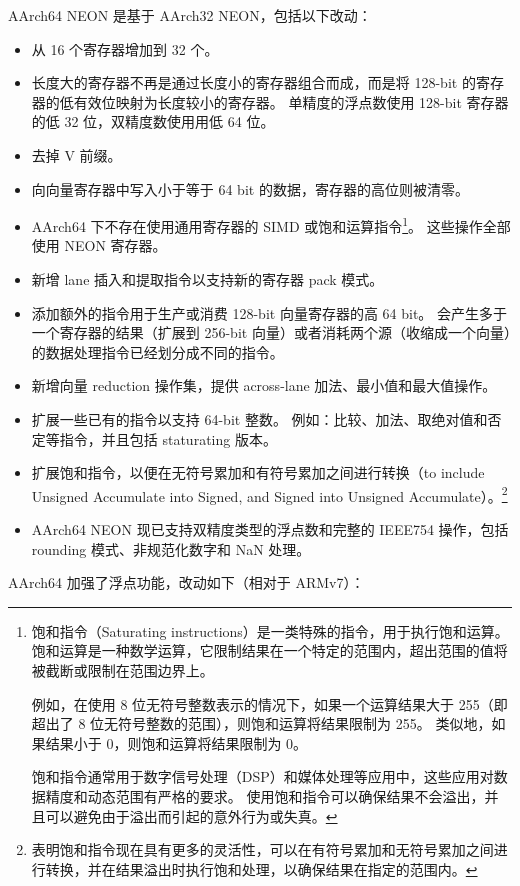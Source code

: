 AArch64 NEON 是基于 AArch32 NEON，包括以下改动：
\begin{itemize}
  \item 从 16 个寄存器增加到 32 个。
  \item 长度大的寄存器不再是通过长度小的寄存器组合而成，而是将 128-bit 的寄存器的低有效位映射为长度较小的寄存器。
    单精度的浮点数使用 128-bit 寄存器的低 32 位，双精度数使用用低 64 位。
  \item 去掉 V 前缀。
  \item 向向量寄存器中写入小于等于 64 bit 的数据，寄存器的高位则被清零。
  \item AArch64 下不存在使用通用寄存器的 SIMD 或饱和运算指令\footnote{
      饱和指令（Saturating instructions）是一类特殊的指令，用于执行饱和运算。
      饱和运算是一种数学运算，它限制结果在一个特定的范围内，超出范围的值将被截断或限制在范围边界上。

      例如，在使用 8 位无符号整数表示的情况下，如果一个运算结果大于 255（即超出了 8 位无符号整数的范围），则饱和运算将结果限制为 255。
      类似地，如果结果小于 0，则饱和运算将结果限制为 0。

      饱和指令通常用于数字信号处理（DSP）和媒体处理等应用中，这些应用对数据精度和动态范围有严格的要求。
      使用饱和指令可以确保结果不会溢出，并且可以避免由于溢出而引起的意外行为或失真。
    }。
    这些操作全部使用 NEON 寄存器。
  \item 新增 lane 插入和提取指令以支持新的寄存器 pack 模式。
  \item 添加额外的指令用于生产或消费 128-bit 向量寄存器的高 64 bit。
    会产生多于一个寄存器的结果（扩展到 256-bit 向量）或者消耗两个源（收缩成一个向量）的数据处理指令已经划分成不同的指令。
  \item 新增向量 reduction 操作集，提供 across-lane 加法、最小值和最大值操作。
  \item 扩展一些已有的指令以支持 64-bit 整数。
    例如：比较、加法、取绝对值和否定等指令，并且包括 staturating 版本。
  \item 扩展饱和指令，以便在无符号累加和有符号累加之间进行转换（to include Unsigned Accumulate into Signed, and Signed into Unsigned Accumulate）。\footnote{
      表明饱和指令现在具有更多的灵活性，可以在有符号累加和无符号累加之间进行转换，并在结果溢出时执行饱和处理，以确保结果在指定的范围内。
    }
  \item AArch64 NEON 现已支持双精度类型的浮点数和完整的 IEEE754 操作，包括 rounding 模式、非规范化数字和 NaN 处理。
\end{itemize}

AArch64 加强了浮点功能，改动如下（相对于 ARMv7）：

